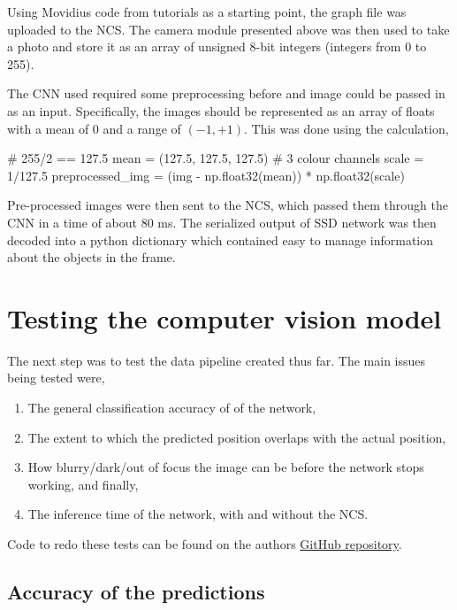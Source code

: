 Using Movidius code from tutorials as a starting point, the graph file was uploaded to the NCS. The camera module presented above was then used to take a photo and store it as an array of unsigned 8-bit integers (integers from 0 to 255).

The CNN used required some preprocessing before and image could be passed in as an input. Specifically, the images should be represented as an array of floats with a mean of 0 and a range of $(-1, +1)$. This was done using the calculation,\\

\begin{python}
# 255/2 == 127.5
mean = (127.5, 127.5, 127.5)  # 3 colour channels
scale = 1/127.5
preprocessed_img = (img - np.float32(mean)) * np.float32(scale)
\end{python}

Pre-processed images were then sent to the NCS, which passed them through the CNN in a time of about 80 ms. The serialized output of SSD network was then decoded into a python dictionary which contained easy to manage information about the objects in the frame.

\section{Testing the computer vision model}
The next step was to test the data pipeline created thus far. The main issues being tested were,

\begin{enumerate}
\item The general classification accuracy of of the network,
\item The extent to which the predicted position overlaps with the actual position,
\item How blurry/dark/out of focus the image can be before the network stops working, and finally,
\item The inference time of the network, with and without the NCS.
\end{enumerate}

Code to redo these tests can be found on the authors \href{https://github.com/alknemeyer/EEE4022S-Thesis-Project/blob/master/Final%20code/tests.ipynb}{GitHub repository}.


\subsection{Accuracy of the predictions}

